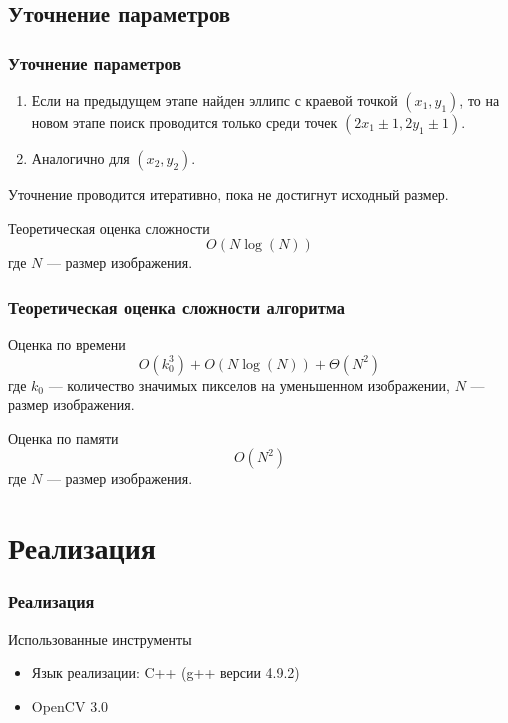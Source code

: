 \documentclass[14pt]{beamer}
\begin{document}
\subsection{Уточнение параметров}
\begin{frame}
\frametitle{Уточнение параметров}
\begin{block}{}
\begin{enumerate}
  \item Если на предыдущем этапе найден эллипс с краевой точкой \((x_1, y_1)\), то на новом этапе поиск проводится только среди точек \((2x_1 \pm 1, 2y_1 \pm 1)\).
  \item Аналогично для \((x_2, y_2)\).
\end{enumerate}
\end{block}
Уточнение проводится итеративно, пока не достигнут исходный размер.
\begin{block}{Теоретическая оценка сложности}
$$O(N\log(N))$$ где $N$ --- размер изображения.
\end{block}
\end{frame}


\begin{frame}
\frametitle{Теоретическая оценка сложности алгоритма}
\begin{block}{Оценка по времени}
$$O(k_0^3) + O(N\log(N)) + \Theta(N^2)$$ где $k_0$ --- количество значимых пикселов на уменьшенном изображении, $N$ --- размер изображения.
\end{block}
\begin{block}{Оценка по памяти}
$$O(N^2)$$ где $N$ --- размер изображения.
\end{block}
\end{frame}

\section{Реализация}
\begin{frame}
\frametitle{Реализация}
\begin{block}{Использованные инструменты}
\begin{itemize}
  \item Язык реализации: C++ (g++ версии 4.9.2)
  \item OpenCV 3.0
\end{itemize}
\end{block}
\end{frame}
\end{document}
